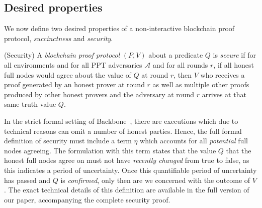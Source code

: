 \subsection{Desired properties}

We now define two desired properties of a non-interactive blockchain proof
protocol, \emph{succinctness} and \emph{security}.

\begin{definition}{(Security)}
A \emph{blockchain proof protocol} $(P, V)$ about a predicate $Q$ is
\emph{secure} if for all environments and for all PPT adversaries $\mathcal{A}$
and for all rounds $r$, if all honest full nodes would agree about the value of
$Q$ at round $r$, then $V$ who receives a proof generated by an honest prover at
round $r$ as well as multiple other proofs produced by other honest provers and
the adversary at round $r$ arrives at that same truth value $Q$.
\end{definition}

\begin{remark}
  In the strict formal setting of Backbone~\cite{backbone}, there are executions
  which due to technical reasons can omit a number of honest parties. Hence, the
  full formal definition of security must include a term $\eta$ which accounts
  for all \emph{potential} full nodes agreeing. The formulation with this term
  states that the value $Q$ that the honest full nodes agree on must not have
  \emph{recently changed} from true to false, as this indicates a period of
  uncertainty. Once this quantifiable period of uncertainty has passed and $Q$
  is \emph{confirmed}, only then are we concerned with the outcome of $V$. The
  exact technical details of this definition are available in the full version
  of our paper, accompanying the complete security proof.
\end{remark}


